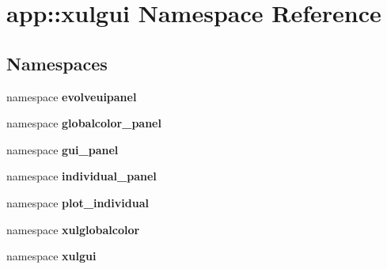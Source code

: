 \section{app::xulgui Namespace Reference}
\label{namespaceapp_1_1xulgui}


\subsection*{Namespaces}
\begin{CompactItemize}
\item 
namespace {\bf evolveuipanel}
\item 
namespace {\bf globalcolor\_\-panel}
\item 
namespace {\bf gui\_\-panel}
\item 
namespace {\bf individual\_\-panel}
\item 
namespace {\bf plot\_\-individual}
\item 
namespace {\bf xulglobalcolor}
\item 
namespace {\bf xulgui}
\end{CompactItemize}
